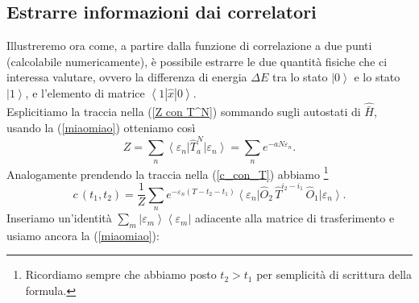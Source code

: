 \documentclass{article}
\begin{document}
\subsection{Estrarre informazioni dai correlatori}
 
Illustreremo ora come, a partire dalla funzione di correlazione a due punti (calcolabile numericamente), è possibile estrarre le due quantità fisiche che ci interessa valutare, ovvero la differenza di energia $\Delta E$ tra lo stato $\left|0\right>$ e lo stato $\left|1\right>$, e l'elemento di matrice $\left<1|\hat{x}|0\right>$.\\
Esplicitiamo la traccia nella (\ref{Z con T^N}) sommando sugli autostati di $\hat{\bar{H}}$, usando la (\ref{miaomiao}) otteniamo così 
\begin{equation}
    Z=\sum_n \left<\varepsilon_n\right|\hat{T}_a^N\left|\varepsilon_n\right>=\sum_n e^{-aN\varepsilon_n}.
\end{equation}
Analogamente prendendo la traccia nella (\ref{c_con_T}) abbiamo \footnote{Ricordiamo sempre che abbiamo posto $t_2>t_1$ per semplicità di scrittura della formula.}
\begin{equation}
    c\,(t_1,t_2)=\frac{1}{Z} \sum_n e^{-\varepsilon_n(T-t_2-t_1)}\left<\varepsilon_n\right|\hat{O}_2\,\hat{T}^{i_2-i_1}\,\hat{O}_1\left|\varepsilon_n\right>.
\end{equation}
Inseriamo un'identità  $\sum_m \left|\varepsilon_m\right>\left<\varepsilon_m\right|$ adiacente alla matrice di trasferimento e usiamo ancora la (\ref{miaomiao}):
\end{document}

